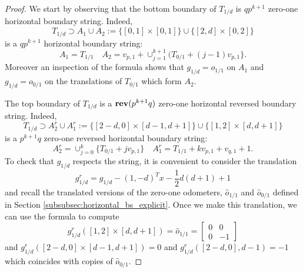 \documentclass[12pt]{amsart}
\begin{document}
\begin{proof}
We start by observing that the bottom boundary of $T_{1/d}$ is $q p^{k+1}$ zero-one horizontal boundary string. Indeed, 
\[
T_{1/d} \supset A_1 \cup A_2 := \{ [0,1] \times [0,1] \} \cup \{ [2,d] \times [0,2]\} 
\]
is a $q p^{k+1}$ horizontal boundary string: 
\[
A_1 = T_{1/1} \quad A_2 = v_{p,1} + \cup_{j=1}^{k+1} ( T_{0/1} + (j-1) v_{p,1}\}   . 
\]
Moreover an inspection of the formula shows that $g_{1/d} = o_{1/1}$ on $A_1$ 
and $g_{1/d} = o_{0/1}$ on the translations of $T_{0/1}$ which form $A_2$.

The top boundary of $T_{1/d}$ is a $\mathop{\bf rev}(p^{k+1} q)$ zero-one horizontal reversed boundary string. Indeed, 
\[
T_{1/d} \supset A_2^r \cup A_1^r := \{ [2-d, 0] \times [d-1,d+1]\} \cup \{[1,2] \times [d,d+1]\} 
\]
is a $p^{k+1} q$ zero-one reversed horizontal boundary string:
\[
A_2^r = \cup_{j=0}^{k} \{ T_{0/1} + j v_{p,1}\} \quad A_1^r = T_{1/1} + k v_{p,1} + v_{q,1}+1.
\]
To check that $g_{1/d}$ respects the string, it is convenient to consider the translation 
\[
g_{1/d}^r  = g_{1/d} - (1,-d)^T x - \frac{1}{2} d (d+1) + 1
\]
and recall the translated versions of the zero-one odometers, $\hat{o}_{1/1}$ and $\hat{o}_{0/1}$ defined in Section \ref{subsubsec:horizontal_bs_explicit}. 
Once we make this translation, we can use the formula to compute
\[
g_{1/d}^r( [1,2] \times [d,d+1]) = \hat{o}_{1/1} = \begin{bmatrix} 0 & 0 \\ 0 & -1 \end{bmatrix}
\]
and $g_{1/d}^r([2-d,0] \times [d-1,d+1]) = 0$ and $g_{1/d}^r([2-d,0], d-1) = -1$ which coincides with copies of $\hat{o}_{0/1}$. 
	

\end{proof}
\end{document}
